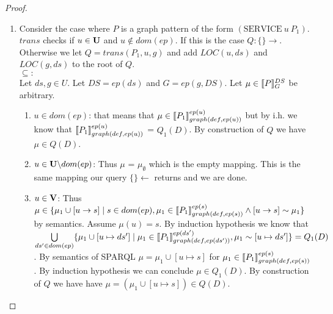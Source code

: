 \begin{proof}
\begin{enumerate}
		\item Consider the case where $P$ is a graph 
			pattern of the form $(\mbox{SERVICE} \ u \ P_1)$.
			$trans$ checks if $u \in \mathbf{U}$ and $u \notin dom(ep)$. If this is the
			case $Q: \{\} \rightarrow$. Otherwise we let $Q = trans(P_1,u,g)$
			and add $LOC(u,ds)$ and $LOC(g,ds)$ to the root of $Q$.\\
			$\subseteq:$\\
			Let $ds,g \in U$. Let $DS = ep(ds)$ and $G = ep(g,DS)$.
			Let $\mu \in \llbracket P \rrbracket^{DS}_{G}$ be arbitrary.
			\begin{enumerate}
				\item  $u \in dom(ep)$:
					that means that $\mu \in \llbracket P_1
					\rrbracket^{ep(u)}_{graph(def,ep(u))}$
					but by i.h. we know that 
					$\llbracket P_1 \rrbracket^{ep(u)}_{graph(def,ep(u))}$ =
					$Q_1(D)$.
					By construction of $Q$ we have $\mu \in Q(D)$.
				\item $u \in \mathbf{U}\backslash dom(ep)$:
					Thus $\mu$ = $\mu_\emptyset$ which is the empty
					mapping. This is the same mapping our query
					$\{\} \leftarrow$ returns and we are
					done.
				\item $u \in \mathbf{V}$:
					Thus $\mu \in \{ \mu_1 \cup [u \rightarrow s ] \mid
						s \in dom(ep), \mu_1 \in \llbracket P_1
						\rrbracket^{ep(s)}_{graph(def,ep(s))} \land
					[u \rightarrow s] \sim \mu_1 \}$ by semantics. 
					Assume $\mu(u) = s$.
					By induction hypothesis we know that 
					$\bigcup\limits_{ds' \in dom(ep)} \{ \mu_1 \cup [u
						\mapsto ds'] \mid \mu_1 \in
						\llbracket P_1\rrbracket^{ep(ds')}_{graph(def,ep(ds'))},
					\mu_1 \sim [u\mapsto ds'] \}  =
					Q_1(D) $. By semantics of SPARQL $\mu = \mu_1 \cup
					[u \mapsto s]$ 
					for $\mu_1 \in \llbracket P_1 \rrbracket^{ep(s)}_{graph(def,ep(s))}$. 
					By induction hypothesis we can conclude
					$\mu \in Q_1(D)$.
					By construction of $Q$ we have have $\mu = (\mu_1 \cup [u
					\mapsto s])	\in Q(D)$. 
			\end{enumerate}


\end{enumerate}
\end{proof}

